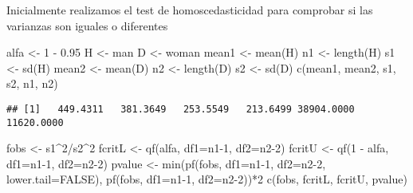 \documentclass[
  a4paper]{article}
\newenvironment{Shaded}{\begin{snugshade}}{\end{snugshade}}
\newcommand{\AttributeTok}[1]{\textcolor[rgb]{0.77,0.63,0.00}{#1}}
\newcommand{\ConstantTok}[1]{\textcolor[rgb]{0.00,0.00,0.00}{#1}}
\newcommand{\DecValTok}[1]{\textcolor[rgb]{0.00,0.00,0.81}{#1}}
\newcommand{\FloatTok}[1]{\textcolor[rgb]{0.00,0.00,0.81}{#1}}
\newcommand{\FunctionTok}[1]{\textcolor[rgb]{0.00,0.00,0.00}{#1}}
\newcommand{\NormalTok}[1]{#1}
\newcommand{\OtherTok}[1]{\textcolor[rgb]{0.56,0.35,0.01}{#1}}
\newcommand{\SpecialCharTok}[1]{\textcolor[rgb]{0.00,0.00,0.00}{#1}}
\begin{document}
Inicialmente realizamos el test de homoscedasticidad para comprobar si
las varianzas son iguales o diferentes

\begin{Shaded}
\begin{Highlighting}[]
\NormalTok{alfa }\OtherTok{\textless{}{-}} \DecValTok{1} \SpecialCharTok{{-}} \FloatTok{0.95}
\NormalTok{H }\OtherTok{\textless{}{-}}\NormalTok{ man}
\NormalTok{D }\OtherTok{\textless{}{-}}\NormalTok{ woman}
\NormalTok{mean1 }\OtherTok{\textless{}{-}} \FunctionTok{mean}\NormalTok{(H)}
\NormalTok{n1 }\OtherTok{\textless{}{-}} \FunctionTok{length}\NormalTok{(H)}
\NormalTok{s1 }\OtherTok{\textless{}{-}} \FunctionTok{sd}\NormalTok{(H)}
\NormalTok{mean2 }\OtherTok{\textless{}{-}} \FunctionTok{mean}\NormalTok{(D)}
\NormalTok{n2 }\OtherTok{\textless{}{-}} \FunctionTok{length}\NormalTok{(D)}
\NormalTok{s2 }\OtherTok{\textless{}{-}} \FunctionTok{sd}\NormalTok{(D)}
\FunctionTok{c}\NormalTok{(mean1, mean2, s1, s2, n1, n2)}
\end{Highlighting}
\end{Shaded}

\begin{verbatim}
## [1]   449.4311   381.3649   253.5549   213.6499 38904.0000 11620.0000
\end{verbatim}

\begin{Shaded}
\begin{Highlighting}[]
\NormalTok{fobs }\OtherTok{\textless{}{-}}\NormalTok{ s1}\SpecialCharTok{\^{}}\DecValTok{2}\SpecialCharTok{/}\NormalTok{s2}\SpecialCharTok{\^{}}\DecValTok{2}
\NormalTok{fcritL }\OtherTok{\textless{}{-}} \FunctionTok{qf}\NormalTok{(alfa, }\AttributeTok{df1=}\NormalTok{n1}\DecValTok{{-}1}\NormalTok{, }\AttributeTok{df2=}\NormalTok{n2}\DecValTok{{-}2}\NormalTok{)}
\NormalTok{fcritU }\OtherTok{\textless{}{-}} \FunctionTok{qf}\NormalTok{(}\DecValTok{1} \SpecialCharTok{{-}}\NormalTok{ alfa, }\AttributeTok{df1=}\NormalTok{n1}\DecValTok{{-}1}\NormalTok{, }\AttributeTok{df2=}\NormalTok{n2}\DecValTok{{-}2}\NormalTok{)}
\NormalTok{pvalue }\OtherTok{\textless{}{-}} \FunctionTok{min}\NormalTok{(}\FunctionTok{pf}\NormalTok{(fobs, }\AttributeTok{df1=}\NormalTok{n1}\DecValTok{{-}1}\NormalTok{, }\AttributeTok{df2=}\NormalTok{n2}\DecValTok{{-}2}\NormalTok{, }\AttributeTok{lower.tail=}\ConstantTok{FALSE}\NormalTok{), }\FunctionTok{pf}\NormalTok{(fobs, }\AttributeTok{df1=}\NormalTok{n1}\DecValTok{{-}1}\NormalTok{, }\AttributeTok{df2=}\NormalTok{n2}\DecValTok{{-}2}\NormalTok{))}\SpecialCharTok{*}\DecValTok{2}
\FunctionTok{c}\NormalTok{(fobs, fcritL, fcritU, pvalue)}
\end{Highlighting}
\end{Shaded}
\end{document}
